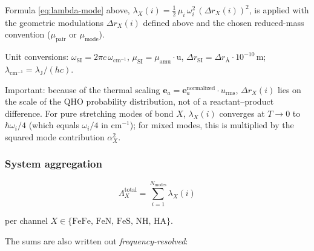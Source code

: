 \documentclass[11pt,a4paper,twoside]{article}
\theoremstyle{remark}
\begin{document}
Formula \eqref{eq:lambda-mode} above,
$\lambda_X(i) = \tfrac{1}{2}\,\mu_i\,\omega_i^2\,(\Delta r_X(i))^2$,
is applied with the geometric modulations $\Delta r_X(i)$ defined
above and the chosen reduced-mass convention ($\mu_\text{pair}$ or
$\mu_\text{mode}$).

Unit conversions: $\omega_\text{SI} = 2\pi c\,\omega_{\text{cm}^{-1}}$,
$\mu_\text{SI} = \mu_{\text{amu}} \cdot \text{u}$,
$\Delta r_\text{SI} = \Delta r_{\text{\AA}} \cdot 10^{-10}$\,m;
$\lambda_{\text{cm}^{-1}} = \lambda_\text{J} / (h c)$.

Important: because of the thermal scaling
$\mathbf{e}_a = \mathbf{e}_a^\text{normalized} \cdot u_\text{rms}$,
$\Delta r_X(i)$ lies on the scale of the QHO probability
distribution, not of a reactant--product difference. For pure
stretching modes of bond $X$, $\lambda_X(i)$ converges at $T \to 0$
to $\hbar\omega_i/4$ (which equals $\omega_i/4$ in cm$^{-1}$); for
mixed modes, this is multiplied by the squared mode contribution
$\alpha_X^2$.

\subsubsection*{System aggregation}

\begin{equation}
  \Lambda_X^\text{total} = \sum_{i=1}^{N_\text{modes}} \lambda_X(i)
  \label{eq:lambda-total}
\end{equation}

per channel $X \in \{\text{FeFe, FeN, FeS, NH, HA}\}$.

The sums are also written out \emph{frequency-resolved}:
\end{document}
